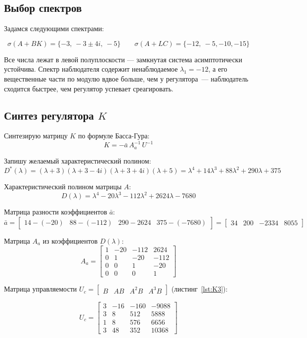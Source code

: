 \documentclass[a4paper,12pt]{article}
\begin{document}
\subsection{Выбор спектров}


Задамся следующими спектрами:

\[
\sigma(A + BK) = \{-3,\ -3 \pm 4i,\ -5\}
\qquad
\sigma(A + LC) = \{-12,\ -5, -10, -15\}
\]

Все числа лежат в левой полуплоскости --- замкнутая система асимптотически устойчива. Спектр наблюдателя содержит ненаблюдаемое $\lambda_1 = -12$,
а его вещественные части по модулю вдвое больше, чем у регулятора~---
наблюдатель сходится быстрее, чем регулятор успевает среагировать.

\subsection{Синтез регулятора \(K\)}

Синтезирую матрицу $K$ по формуле Басса-Гура:
\[
K = -\bar{a}\, A_a^{-1}\, U^{-1}
\]

Запишу желаемый характеристический полином:
\[
D^*(\lambda) = (\lambda + 3)(\lambda + 3 - 4i)(\lambda + 3 + 4i)(\lambda + 5)
= \lambda^4 + 14\lambda^3 + 88\lambda^2 + 290\lambda + 375
\]

Характеристический полином матрицы $A$:
\[
D(\lambda) = \lambda^4 - 20\lambda^3 - 112\lambda^2 + 2624\lambda - 7680
\]

Матрица разности коэффициентов $\bar{a}$:
\[
\bar{a} = \begin{bmatrix}
	14 - (-20) & 88 - (-112) & 290 - 2624 & 375 - (-7680)
\end{bmatrix}
= \begin{bmatrix}
	34 & 200 & -2334 & 8055
\end{bmatrix}
\]

Матрица $A_a$ из коэффициентов $D(\lambda)$:
\[
A_a = \begin{bmatrix}
	1 & -20 & -112 &  2624 \\
	0 &   1 &  -20 &  -112 \\
	0 &   0 &    1 &   -20 \\
	0 &   0 &    0 &     1
\end{bmatrix}
\]

Матрица управляемости $U_c = \begin{bmatrix} B & AB & A^2B & A^3B \end{bmatrix}$ (листинг~\ref{lst:K3}):

\[
U_c =
\begin{bmatrix}
	3 & -16 & -160 & -9088 \\
	3 &   8 &  512 &  5888 \\
	1 &   8 &  576 &  6656 \\
	3 &  48 &  352 & 10368
\end{bmatrix}
\]
\end{document}
